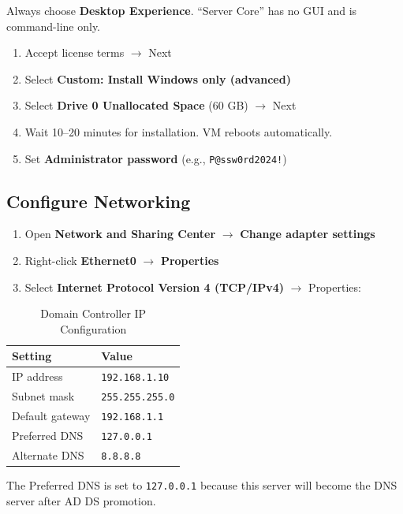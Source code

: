 ﻿\documentclass[12pt,a4paper]{article}
\begin{document}
\begin{warningbox}
Always choose \textbf{Desktop Experience}. ``Server Core'' has no GUI and is command-line only.
\end{warningbox}

\begin{enumerate}[resume]
    \item Accept license terms $\rightarrow$ Next
    \item Select \textbf{Custom: Install Windows only (advanced)}
    \item Select \textbf{Drive 0 Unallocated Space} (60 GB) $\rightarrow$ Next
    \item Wait 10--20 minutes for installation. VM reboots automatically.
    \item Set \textbf{Administrator password} (e.g., \texttt{P@ssw0rd2024!})
\end{enumerate}

\subsection{Configure Networking}

\begin{enumerate}
    \item Open \textbf{Network and Sharing Center} $\rightarrow$ \textbf{Change adapter settings}
    \item Right-click \textbf{Ethernet0} $\rightarrow$ \textbf{Properties}
    \item Select \textbf{Internet Protocol Version 4 (TCP/IPv4)} $\rightarrow$ Properties:
\end{enumerate}

\begin{table}[H]
\centering
\begin{tabularx}{0.6\textwidth}{l X}
\toprule
\textbf{Setting} & \textbf{Value} \\
\midrule
IP address       & \texttt{192.168.1.10} \\
Subnet mask      & \texttt{255.255.255.0} \\
Default gateway  & \texttt{192.168.1.1} \\
Preferred DNS    & \texttt{127.0.0.1} \\
Alternate DNS    & \texttt{8.8.8.8} \\
\bottomrule
\end{tabularx}
\caption{Domain Controller IP Configuration}
\end{table}

\begin{tipbox}
The Preferred DNS is set to \texttt{127.0.0.1} because this server will become the DNS server after AD DS promotion.
\end{tipbox}
\end{document}
